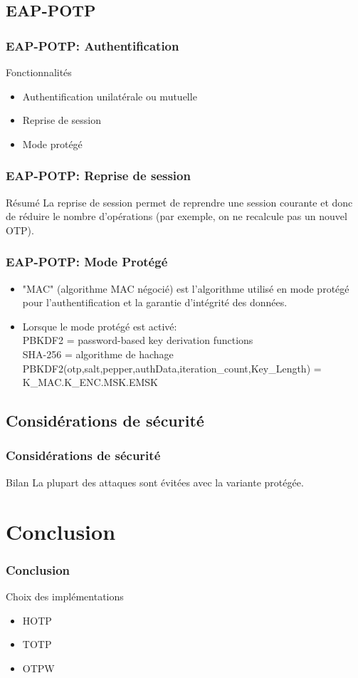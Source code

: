 \documentclass{beamer}
\begin{document}
\subsection{EAP-POTP}
\begin{frame}
\frametitle{EAP-POTP: Authentification}
\begin{block}{Fonctionnalités}
\begin{itemize}
\item Authentification unilatérale ou mutuelle
\item Reprise de session
\item Mode protégé

\end{itemize}
\end{block}
\end{frame}

\begin{frame}
\frametitle{EAP-POTP: Reprise de session}
\begin{block}{Résumé}
La reprise de session permet de reprendre une session courante et donc de réduire le nombre d'opérations (par exemple, on ne recalcule pas un nouvel OTP).
\end{block}

\end{frame}

\begin{frame}
\frametitle{EAP-POTP: Mode Protégé}
\begin{itemize}
\item "MAC" (algorithme MAC négocié) est l'algorithme utilisé en mode protégé pour l'authentification et la garantie d'intégrité des données.
\item Lorsque le mode protégé est activé:\\
PBKDF2 = password-based key derivation functions\\
SHA-256 = algorithme de hachage\\
PBKDF2(otp,salt,pepper,authData,iteration\_count,Key\_Length) = K\_MAC.K\_ENC.MSK.EMSK
\end{itemize}

\end{frame}

\subsection{Considérations de sécurité}
\begin{frame}
\frametitle{Considérations de sécurité}
\begin{block}{Bilan}
La plupart des attaques sont évitées avec la variante protégée.
\end{block}
\end{frame}

\section{Conclusion}
\begin{frame}
\frametitle{Conclusion}
\begin{block}{Choix des implémentations}
\begin{itemize}
\item HOTP
\item TOTP
\item OTPW
\end{itemize}
\end{block}
\end{frame}
\end{document}
